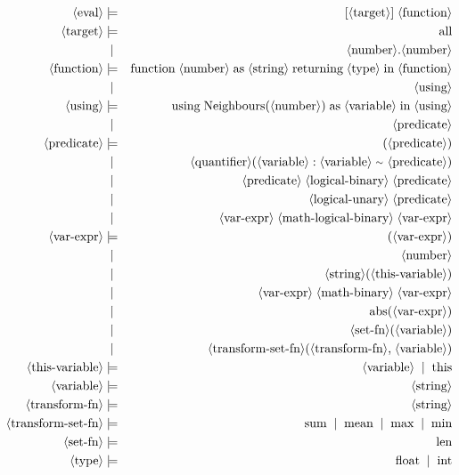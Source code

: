 \begin{eqnarray*}
	\pn{eval} & \pp & [ \pn{target} ] \ww \pn{function} \\
	\pn{target} & \pp & \sm{all} \\
	~ & \oo & \pn{number}\sm{.}\pn{number} \\
%
	\pn{function} & \pp & \sm{function} \ww \pn{number} \ww \sm{as} \ww \pn{string} \ww \sm{returning} \ww \pn{type} \ww \sm{in} \ww \pn{function} \\
	~ & \oo & \pn{using} \\
%
	\pn{using} & \pp & \sm{using} \ww \sm{Neighbours}\sm{(}\pn{number}\sm{)} \ww \sm{as} \ww \pn{variable} \ww \sm{in} \ww \pn{using} \\
	~ & \oo & \pn{predicate} \\
%
	\pn{predicate} & \pp &  \sm{(}\pn{predicate}\sm{)} \\
	~ & \oo & \pn{quantifier}\sm{(}\pn{variable} \ww \sm{:} \ww \pn{variable} \ww \sm{\mytilde} \pn{predicate} \sm{)}\\
	~ & \oo &  \pn{predicate} \ww \pn{logical-binary} \ww \pn{predicate} \\
	~ & \oo &  \pn{logical-unary} \ww \pn{predicate} \\
	~ & \oo &  \pn{var-expr} \ww \pn{math-logical-binary} \ww \pn{var-expr} \\
%
	\pn{var-expr} & \pp & \sm{(}\pn{var-expr}\sm{)} \\
	~ & \oo & \pn{number} \\
	~ & \oo & \pn{string}\sm{(}\pn{this-variable}\sm{)} \\
	~ & \oo & \pn{var-expr} \ww \pn{math-binary} \ww \pn{var-expr} \\
	~ & \oo & \sm{abs}\sm{(}\pn{var-expr}\sm{)} \\
	~ & \oo & \pn{set-fn}\sm{(}\pn{variable}\sm{)} \\
	~ & \oo & \pn{transform-set-fn}\sm{(}\pn{transform-fn}\sm{,} \ww \pn{variable}\sm{)} \\
%
	\pn{this-variable} & \pp & \pn{variable} \oo \sm{this} \\
	\pn{variable} & \pp & \pn{string} \\
%
	\pn{transform-fn} & \pp & \pn{string} \\
	\pn{transform-set-fn} & \pp & \sm{sum} \oo  \sm{mean} \oo \sm{max} \oo \sm{min} \\
	\pn{set-fn} & \pp & \sm{len} \\
%
	\pn{type} & \pp & \sm{float} \oo \sm{int} \\

\end{eqnarray*}
